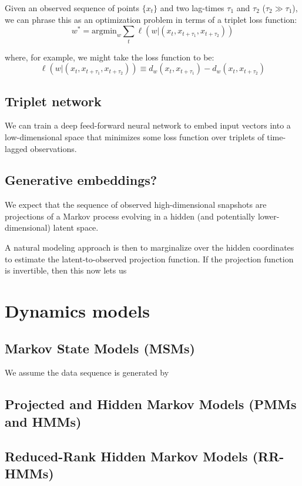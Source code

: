 \documentclass[aps,prl,preprint,nofootinbib,superscriptaddress,linenumbers]{revtex4-1}
\begin{document}
Given an observed sequence of points $\{x_t\}$ and two lag-times $\tau_1$ and $\tau_2$ ($\tau_2 \gg \tau_1$), we can phrase this as an optimization problem in terms of a triplet loss function:
$$w^* = \text{argmin}_w \sum_{t} \ell(w | (x_t,x_{t+\tau_1},x_{t+\tau_2}))$$

where, for example, we might take the loss function to be: $$ \ell(w | (x_t,x_{t+\tau_1},x_{t+\tau_2})) \equiv d_w(x_t,x_{t+\tau_1})-d_w(x_t,x_{t+\tau_2}) $$

\subsection{Triplet network}
We can train a deep feed-forward neural network to embed input vectors into a low-dimensional space that minimizes some loss function over triplets of time-lagged observations.

\subsection{Generative embeddings?}
We expect that the sequence of observed high-dimensional snapshots are projections of a Markov process evolving in a hidden (and potentially lower-dimensional) latent space.

A natural modeling approach is then to marginalize over the hidden coordinates to estimate the latent-to-observed projection function. If the projection function is invertible, then this now lets us 

\section{Dynamics models}
\subsection{Markov State Models (MSMs)}
We assume the data sequence is generated by 

\subsection{Projected and Hidden Markov Models (PMMs and HMMs)}



\subsection{Reduced-Rank Hidden Markov Models (RR-HMMs)}
\end{document}
